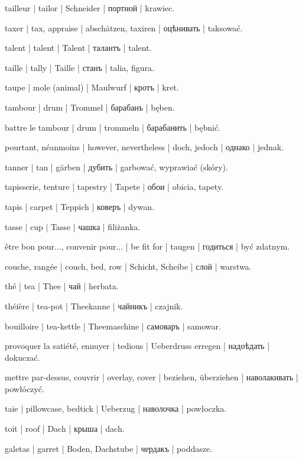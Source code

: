 \begin{outdent}{1em}
tailleur | tailor | Schneider | портной | krawiec.

taxer | tax, appraise | abschätzen, taxiren | оцѣнивать | taksować.

talent | talent | Talent | талантъ | talent.

taille | tally | Taille | станъ | talia, figura.

taupe | mole (animal) | Maulwurf | кротъ | kret.

tambour | drum | Trommel | барабанъ | bęben.

\uvsubentry{}
battre le tambour | drum | trommeln | барабанить | bębnić.

pourtant, néanmoins | however, nevertheless | doch, jedoch | однако | jednak.

tanner | tan | gärben | дубить | garbować, wyprawiać (skóry).

tapisserie, tenture | tapestry | Tapete | обои | obicia,
tapety.

tapis | carpet | Teppich | коверъ | dywan.

tasse | cup | Tasse | чашка | filiżanka.

être bon pour..., convenir pour... | be fit for | taugen | годиться | być zdatnym.

couche, rangée | couch, bed, row | Schicht, Scheibe | слой | warstwa.

thé | tea | Thee | чай | herbata.

\uvsubentry{}
théière | tea-pot | Theekanne | чайникъ | czajnik.


\uvsubentry{}
bouilloire | tea-kettle | Theemaschine | самоваръ | samowar.

provoquer la satiété, ennuyer | tedious | Ueberdruss erregen | надоѣдать | dokuczać.

mettre par-dessus, couvrir | overlay, cover | beziehen,
überziehen | наволакивать | powłóczyć.

\uvsubentry{}
taie | pillowcase, bedtick | Ueberzug | наволочка | powłoczka.

toit | roof | Dach | крыша | dach.

\uvsubentry{}
galetas | garret | Boden, Dachstube | чердакъ | poddasze.


\end{outdent}
